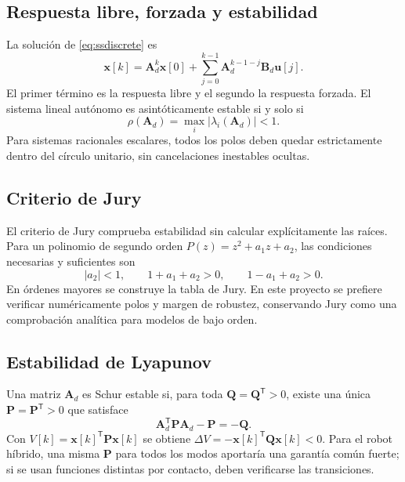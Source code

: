 \documentclass[11pt,letterpaper]{article}
\newcommand{\vect}[1]{\bm{#1}}
\newcommand{\mat}[1]{\bm{#1}}
\newcommand{\trans}{^{\mathsf T}}
\begin{document}
\subsection{Respuesta libre, forzada y estabilidad}
La solución de \cref{eq:ssdiscrete} es
\begin{equation}
 \vect x[k]=\mat A_d^k\vect x[0]
 +\sum_{j=0}^{k-1}\mat A_d^{k-1-j}\mat B_d\vect u[j].
 \label{eq:discretesolution}
\end{equation}
El primer término es la respuesta libre y el segundo la respuesta forzada. El
sistema lineal autónomo es asintóticamente estable si y solo si
\begin{equation}
 \rho(\mat A_d)=\max_i|\lambda_i(\mat A_d)|<1.
 \label{eq:schur}
\end{equation}
Para sistemas racionales escalares, todos los polos deben quedar estrictamente
dentro del círculo unitario, sin cancelaciones inestables ocultas.

\subsection{Criterio de Jury}
El criterio de Jury comprueba estabilidad sin calcular explícitamente las
raíces. Para un polinomio de segundo orden
$P(z)=z^2+a_1z+a_2$, las condiciones necesarias y suficientes son
\begin{equation}
 |a_2|<1,\qquad 1+a_1+a_2>0,\qquad 1-a_1+a_2>0.
 \label{eq:jury2}
\end{equation}
En órdenes mayores se construye la tabla de Jury. En este proyecto se prefiere
verificar numéricamente polos y margen de robustez, conservando Jury como una
comprobación analítica para modelos de bajo orden.

\subsection{Estabilidad de Lyapunov}
Una matriz $\mat A_d$ es Schur estable si, para toda $\mat Q=\mat Q\trans>0$,
existe una única $\mat P=\mat P\trans>0$ que satisface
\begin{equation}
 \mat A_d\trans\mat P\mat A_d-\mat P=-\mat Q.
 \label{eq:dlyap}
\end{equation}
Con $V[k]=\vect x[k]\trans\mat P\vect x[k]$ se obtiene
$\Delta V=-\vect x[k]\trans\mat Q\vect x[k]<0$. Para el robot híbrido, una
misma $\mat P$ para todos los modos aportaría una garantía común fuerte; si se
usan funciones distintas por contacto, deben verificarse las transiciones.
\end{document}
